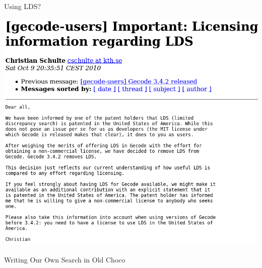 \documentclass{beamer}
\begin{document}
\begin{frame}{Using LDS?}
    \begin{center}
        \includegraphics*[keepaspectratio=true,scale=0.2]{images/lds-patent.png}
    \end{center}
\end{frame}

\begin{frame}{Writing Our Own Search in Old Choco}

\end{frame}
\end{document}
